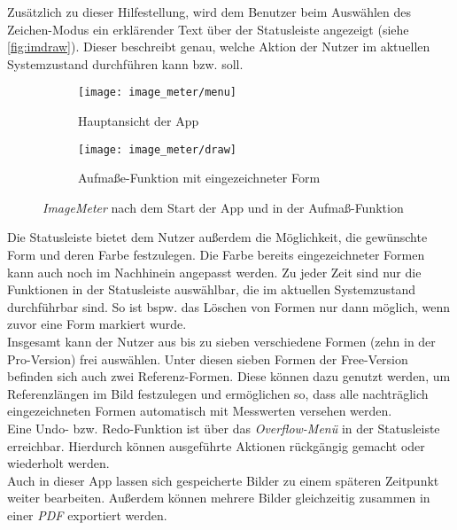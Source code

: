 Zusätzlich zu dieser Hilfestellung, wird dem Benutzer beim Auswählen des Zeichen-Modus ein erklärender Text über der Statusleiste angezeigt (siehe \autoref{fig:imdraw}).
Dieser beschreibt genau, welche Aktion der Nutzer im aktuellen Systemzustand durchführen kann bzw. soll. \\

\begin{figure}[h]
  \centering
  \begin{subfigure}[t]{0.49\textwidth}
    \texttt{[image: image\_meter/menu]}
    \caption{Hauptansicht der App}
    \label{fig:immenu}	
  \end{subfigure}
  \begin{subfigure}[t]{0.49\textwidth}
    \texttt{[image: image\_meter/draw]}
    \caption{Aufmaße-Funktion mit eingezeichneter Form} 
    \label{fig:imdraw}	
  \end{subfigure}
  \caption{\emph{ImageMeter} nach dem Start der App und in der Aufmaß-Funktion}
\end{figure}

\noindent
Die Statusleiste bietet dem Nutzer außerdem die Möglichkeit, die gewünschte Form und deren Farbe festzulegen.
Die Farbe bereits eingezeichneter Formen kann auch noch im Nachhinein angepasst werden.
Zu jeder Zeit sind nur die Funktionen in der Statusleiste auswählbar, die im aktuellen Systemzustand durchführbar sind.
So ist bspw. das Löschen von Formen nur dann möglich, wenn zuvor eine Form markiert wurde. \\

Insgesamt kann der Nutzer aus bis zu sieben verschiedene Formen (zehn in der Pro-Version) frei auswählen.
Unter diesen sieben Formen der Free-Version befinden sich auch zwei Referenz-Formen.
Diese können dazu genutzt werden, um Referenzlängen im Bild festzulegen und ermöglichen so, dass alle nachträglich eingezeichneten Formen automatisch mit Messwerten versehen werden. \\

Eine Undo- bzw. Redo-Funktion ist über das \emph{Overflow-Menü} in der Statusleiste erreichbar.
Hierdurch können ausgeführte Aktionen rückgängig gemacht oder wiederholt werden. \\

Auch in dieser App lassen sich gespeicherte Bilder zu einem späteren Zeitpunkt weiter bearbeiten.
Außerdem können mehrere Bilder gleichzeitig zusammen in einer \emph{PDF} exportiert werden.

